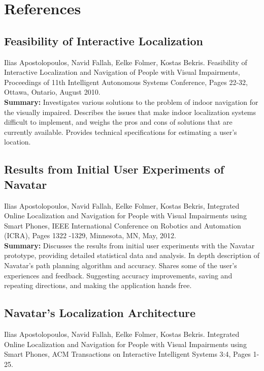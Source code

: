 \documentclass{scrreprt}
\begin{document}
\chapter{References}

\section{Feasibility of Interactive Localization}
Ilias Apostolopoulos, Navid Fallah, Eelke Folmer, Kostas Bekris. Feasibility of Interactive Localization and Navigation of People with Visual Impairments, Proceedings of 11th Intelligent Autonomous Systems Conference, Pages 22-32, Ottawa, Ontario, August 2010.\\
 
 \textbf{Summary:}
 Investigates various solutions to the problem of indoor navigation for the visually impaired. Describes the issues that make indoor localization systems difficult to implement, and weighs the pros and cons of solutions that are currently available. Provides technical specifications for estimating a user’s location.
 
\section{Results from Initial User Experiments of Navatar}
Ilias Apostolopoulos, Navid Fallah, Eelke Folmer, Kostas Bekris, Integrated Online Localization and Navigation for People with Visual Impairments using Smart Phones, IEEE International Conference on Robotics and Automation (ICRA), Pages 1322 -1329, Minnesota, MN, May, 2012.\\

\textbf{Summary:}
Discusses the results from initial user experiments with the Navatar prototype, providing detailed statistical data and analysis. In depth description of Navatar’s path planning algorithm and accuracy. Shares some of the user’s experiences and feedback. Suggesting accuracy improvements, saving and repeating directions, and making the application hands free.

\section{Navatar’s Localization Architecture}
 Ilias Apostolopoulos, Navid Fallah, Eelke Folmer, Kostas Bekris. Integrated Online Localization and Navigation for People with Visual Impairments using Smart Phones, ACM Transactions on Interactive Intelligent Systems 3:4, Pages 1-25.\\
\end{document}
